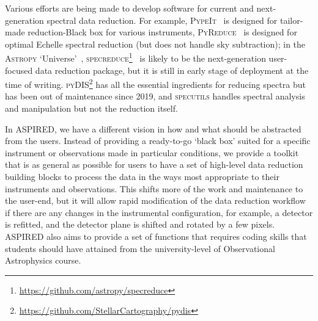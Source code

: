 \documentclass[twocolumn, linenumbers]{aastex631}
\begin{document}
Various efforts are being made to develop software for current and
next-generation  spectral data reduction. For example,
\textsc{PypeIt}~\citep{pypeit:zenodo, 2020JOSS....5.2308P} is designed for
tailor-made reduction-Black box for various instruments,
\textsc{PyReduce}~\citep{2021A&A...646A..32P} is designed for optimal Echelle
spectral reduction (but does not handle sky subtraction); in the \textsc{Astropy}
`Universe'~\citep{astropy:2013, astropy:2018},
\textsc{specreduce}\footnote{\url{https://github.com/astropy/specreduce}}~\citep{pickering_timothy_2022_7007991} is likely to be the
next-generation user-focused data reduction package, but it is still in early
stage of deployment at the time of writing.
\textsc{pyDIS}\footnote{\url{https://github.com/StellarCartography/pydis}} has
all the essential ingredients for reducing spectra but has been out of
maintenance since 2019, and \textsc{specutils}
handles spectral analysis and manipulation but not the reduction itself.

In \textsc{ASPIRED}, we have a different vision in how and what should be abstracted from the
users. Instead of providing a ready-to-go `black box' suited for a specific instrument
or observations made in particular conditions, we provide a toolkit that is as general
as possible for users to have a set of high-level data reduction building blocks to
process the data in the ways most appropriate to their instruments and observations.
This shifts more of the work and maintenance to the user-end, but it will allow rapid
modification of the data reduction workflow if there are any changes in the instrumental
configuration, for example, a detector is refitted, and the detector plane is shifted and
rotated by a few pixels. \textsc{ASPIRED} also aims to provide a set of functions that requires
coding skills that students should have attained from the university-level of Observational
Astrophysics course.
\end{document}

